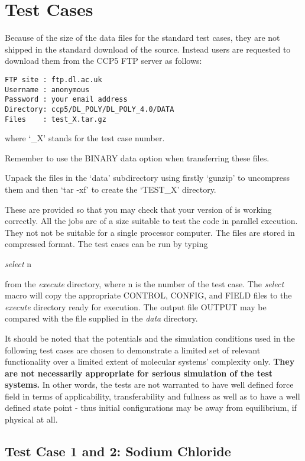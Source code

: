 \section{Test Cases}

Because of the size of the data files for the \D
standard test cases, they are not shipped in the standard
download of the \D source.  Instead users are requested
to download them from the CCP5 FTP server as follows:

\begin{verbatim}
FTP site : ftp.dl.ac.uk
Username : anonymous
Password : your email address
Directory: ccp5/DL_POLY/DL_POLY_4.0/DATA
Files    : test_X.tar.gz
\end{verbatim}

where `\_X' stands for the test case number.

Remember to use the BINARY data option when transferring these
files.

Unpack the files in the `data' subdirectory using firstly
`gunzip' to uncompress them and then `tar -xf' to create the
`TEST\_X' directory.

These are provided so that you may check that your version of
\D is working correctly.  All the jobs are of a size suitable
to test the code in parallel execution.  They not not be
suitable for a single processor computer.  The files are stored
in compressed format.  The test cases can be run by typing

{\sl select } n

\noindent from the {\em execute} directory, where n is the number of
the test case.  The {\sl select} macro will copy the appropriate
CONTROL, CONFIG, and FIELD files to the {\em execute} directory
ready for execution.  The output file OUTPUT may be compared with
the file supplied in the {\em data} directory.

It should be noted that the potentials and the simulation
conditions used in the following test cases are chosen to
demonstrate a limited set of relevant functionality over
a limited extent of molecular systems' complexity only.
{\bf They are not necessarily appropriate for serious
simulation of the test systems.}  In other words, the
tests are not warranted to have well defined force field
in terms of applicability, transferability and fullness
as well as to have a well defined state point - thus
initial configurations may be away from equilibrium, if
physical at all.

\subsection{Test Case 1 and 2: Sodium Chloride}

